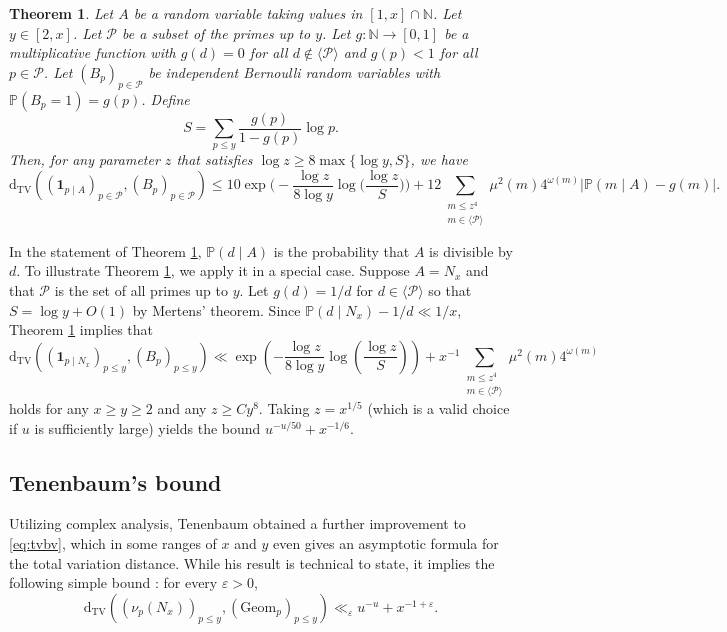 \documentclass{article}
\theoremstyle{plain}
\newtheorem{thm}{Theorem}[section]
\theoremstyle{remark}
\newcommand{\PP}{\mathbb{P}}
\newcommand{\NN}{\mathbb{N}}
\newcommand{\Pa}{\mathcal{P}}
\newcommand{\dtv}{\mathrm{d}_{\mathrm{TV}}}
\newcommand{\Geom}{\mathrm{Geom}}
\numberwithin{equation}{section}
\begin{document}
\begin{thm}\cite[pp.~129--132]{Elliott1}\label{thm:Kub}
Let $A$ be a random variable  taking values in $[1,x]\cap \NN$. Let $y\in [2,x]$. Let $\Pa$ be a subset of the primes up to $y$. Let $g\colon \NN\to [0,1]$ be a multiplicative function with $g(d)=0$ for all $d\not\in \langle \Pa\rangle$ and  $g(p)<1$ for all $p\in \Pa$. Let $(B_p)_{p\in \Pa}$ be independent Bernoulli random variables with $\PP(B_p=1)=g(p)$. 	Define
\[ S=\sum_{p\le y}\frac{g(p)}{1-g(p)}\log p.\] 
Then, 	for any parameter $z$ that satisfies $\log z\ge 8\max\{\log y,S\}$, we have
	\[	\dtv( (\mathbf{1}_{p\mid A})_{p\in \Pa}, (B_p)_{p \in \Pa}) \le 10 \exp\bigg( -\frac{\log z}{8\log y}\log\bigg( \frac{\log z}{S}\bigg)\bigg)+12\sum_{\substack{m\le z^4 \\m\in \langle \Pa\rangle}}\mu^2(m)4^{\omega(m)}|\PP(m \mid A)-g(m)|.\]
	\end{thm}
	In the statement of Theorem \ref{thm:Kub}, $\PP(d\mid A)$ is the probability that $A$ is divisible by $d$. To illustrate Theorem \ref{thm:Kub}, we apply it in a special case. Suppose $A=N_x$ and that $\Pa$ is the set of all primes up to $y$. Let $g(d)=1/d$ for $d\in \langle \Pa \rangle$ so that $S=\log y + O(1)$ by Mertens' theorem. Since $\PP(d\mid N_x)-1/d \ll 1/x$, Theorem \ref{thm:Kub} implies that
\[	\dtv( (\mathbf{1}_{p\mid N_x})_{p\le y}, (B_p)_{p \le y}) \ll \exp\left( -\frac{\log z}{8\log y}\log\left( \frac{\log z}{S}\right)\right)+x^{-1}\sum_{\substack{m\le z^4\\ m\in \langle \Pa \rangle}}\mu^2(m)4^{\omega(m)}\]
holds for any $x\ge y \ge 2$ and any $z\ge Cy^8$. Taking $z=x^{1/5}$ (which is a valid choice if $u$ is sufficiently large) yields the bound $u^{-u/50}+x^{-1/6}$.
\subsection{Tenenbaum's bound}
Utilizing complex analysis, Tenenbaum \cite[Th\'{e}or\`{e}me 1]{TenenbaumCrible} obtained a further improvement to \eqref{eq:tvbv}, which in some ranges of $x$ and $y$ even gives an asymptotic formula for the total variation distance. While his result is technical to state,  it implies  the following simple bound \cite[Equation~(1.7)]{TenenbaumCrible}: for every $\varepsilon>0$,
\begin{equation}\label{eq:tenen}
	\dtv( (\nu_p(N_x))_{p\le y}, (\Geom_p)_{p\le y})\ll_{\varepsilon}  u^{-u}+x^{-1+\varepsilon}.
\end{equation}
\end{document}

